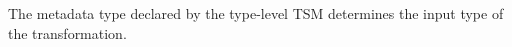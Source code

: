 \documentclass{sig-alternate}
\newcommand{\typekwparsercolor}[1]{\textcolor[HTML]{7C803E}{#1}}
\newcommand{\typecolor}[1]{\textcolor[HTML]{660066}{#1}}
\newcommand{\mycaption}[1]{\vspace{-4px}\caption{#1}\vspace{-2px}}
\begin{document}
The metadata type declared by the type-level TSM determines the input type of the transformation.




\end{document}
